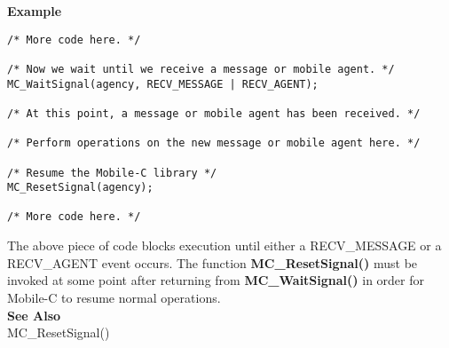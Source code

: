\noindent
{\bf Example}\\
\begin{verbatim}
/* More code here. */

/* Now we wait until we receive a message or mobile agent. */
MC_WaitSignal(agency, RECV_MESSAGE | RECV_AGENT);

/* At this point, a message or mobile agent has been received. */

/* Perform operations on the new message or mobile agent here. */

/* Resume the Mobile-C library */
MC_ResetSignal(agency);

/* More code here. */
\end{verbatim}
\noindent
The above piece of code blocks execution until either a RECV\_MESSAGE or a 
RECV\_AGENT event occurs.
The function {\bf MC\_ResetSignal()} must be invoked at some point after 
returning from {\bf MC\_WaitSignal()} in order for Mobile-C to resume normal 
operations.\\

\noindent
{\bf See Also}\\
MC\_ResetSignal()\\

